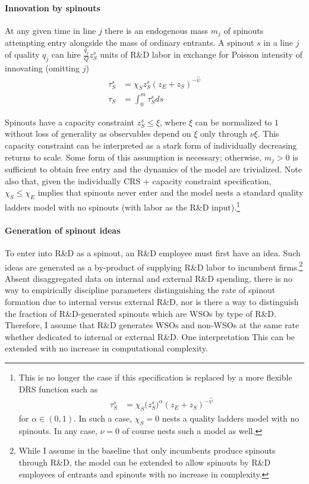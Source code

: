 \documentclass[12pt,english]{article}
\theoremstyle{remark}
\begin{document}
\paragraph{Innovation by spinouts}

At any given time in line $j$ there is an endogenous mass $m_j$ of spinouts attempting entry alongside the mass of ordinary entrants. A spinout $s$ in a line $j$ of quality $q_j$ can hire $ \frac{q_j}{Q} z_S^s$ units of R\&D labor in exchange for Poisson intensity of innovating (omitting $j$)
\begin{align}
\tau_S^s &= \chi_S z_S^s (z_E+ z_S)^{-\hat{\psi}}\label{spinout_entry_rate_eq} \\
\tau_S &= \int_0^m \tau_S^s ds \nonumber
\end{align}

Spinouts have a capacity constraint $z_S^s \le \xi$, where $\xi$ can be normalized to $1$ without loss of generality as observables depend on $\xi$ only through $\nu \xi$. This capacity constraint can be interpreted as a stark form of individually decreasing returns to scale. Some form of this assumption is necessary; otherwise, $m_j > 0$ is sufficient to obtain free entry and the dynamics of the model are trivialized. Note also that, given the individually CRS + capacity constraint specification, $\chi_S \le \chi_E$ implies that spinouts never enter and the model nests a standard quality ladders model with no spinouts (with labor as the R\&D input).\footnote{This is no longer the case if this specification is replaced by a more flexible DRS function such as 
	\begin{align}
	\tau_S^s &= \chi_S \Big(z_S^s\Big)^{\alpha} (z_E+ z_S)^{-\hat{\psi}} \nonumber
	\end{align}
	for $\alpha \in (0,1)$. In such a case, $\chi_S = 0$ nests a quality ladders model with no spinouts. In any case, $\nu = 0$ of course nests such a model as well.}

\paragraph{Generation of spinout ideas}

To enter into R\&D as a spinout, an R\&D employee must first have an idea. Such ideas are generated as a by-product of supplying R\&D labor to incumbent firms.\footnote{While I assume in the baseline that only incumbents produce spinouts through R\&D, the model can be extended to allow spinouts by R\&D employees of entrants and spinouts with no increase in complexity.} Absent disaggregated data on internal and external R\&D spending, there is no way to empirically discipline parameters distinguishing the rate of spinout formation due to internal versus external R\&D, nor is there a way to distinguish the fraction of R\&D-generated spinouts which are WSOs by type of R\&D. Therefore, I assume that R\&D generates WSOs and non-WSOs at the same rate whether dedicated to internal or external R\&D. One interpretation This can be extended with no increase in computational complexity. 
\end{document}
